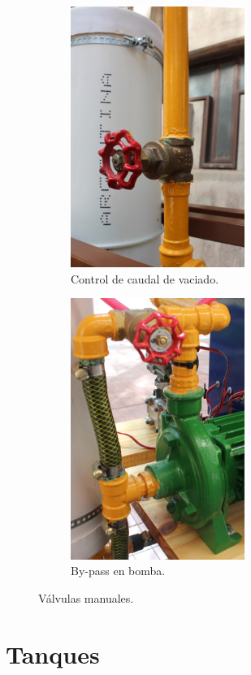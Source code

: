 \begin{figure}[t]
        \centering
        \begin{subfigure}[b]{0.40\textwidth}
\includegraphics[height=8.5cm]{Cap2-DisenoEnsamblado/images/valvTanque.JPG}
                \caption{Control de caudal de vaciado.}
                \label{fig:valvTanque}
        \end{subfigure}%
\hfill
        \begin{subfigure}[b]{0.40\textwidth}
\includegraphics[height=8.5cm]{Cap2-DisenoEnsamblado/images/valvBomba.JPG}
                \caption{By-pass en bomba.}
                \label{fig:valvBomba}
        \end{subfigure}
        \caption{Válvulas manuales.}
        \label{fig:valvManuales}
\end{figure} 
 
\section{Tanques}
\label{sec:Tanques}


